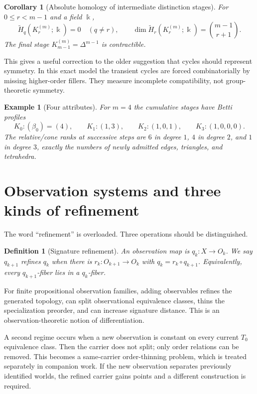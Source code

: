 \documentclass[11pt]{article}
\newtheorem{corollary}[theorem]{Corollary}
\newtheorem{definition}[theorem]{Definition}
\newtheorem{example}[theorem]{Example}
\begin{document}
\begin{corollary}[Absolute homology of intermediate distinction stages]
For $0\le r<m-1$ and a field $\Bbbk$,
\[
\widetilde H_q(K_r^{(m)};\Bbbk)=0\quad(q\neq r),
\qquad
\dim\widetilde H_r(K_r^{(m)};\Bbbk)=\binom{m-1}{r+1}.
\]
The final stage $K_{m-1}^{(m)}=\Delta^{m-1}$ is contractible.
\end{corollary}

This gives a useful correction to the older suggestion that cycles should represent symmetry.  In this exact model the transient cycles are forced combinatorially by missing higher-order fillers.  They measure incomplete compatibility, not group-theoretic symmetry.

\begin{example}[Four attributes]
For $m=4$ the cumulative stages have Betti profiles
\[
K_0:(\beta_0)=(4),\qquad
K_1:(1,3),\qquad
K_2:(1,0,1),\qquad
K_3:(1,0,0,0).
\]
The relative/cone ranks at successive steps are $6$ in degree $1$, $4$ in degree $2$, and $1$ in degree $3$, exactly the numbers of newly admitted edges, triangles, and tetrahedra.
\end{example}

\section{Observation systems and three kinds of refinement}

The word ``refinement'' is overloaded.  Three operations should be distinguished.

\begin{definition}[Signature refinement]
An observation map is $q_k:X\to O_k$.  We say $q_{k+1}$ refines $q_k$ when there is $r_k:O_{k+1}\to O_k$ with $q_k=r_k\circ q_{k+1}$.  Equivalently, every $q_{k+1}$-fiber lies in a $q_k$-fiber.
\end{definition}

For finite propositional observation families, adding observables refines the generated topology, can split observational equivalence classes, thins the specialization preorder, and can increase signature distance.  This is an observation-theoretic notion of differentiation.

A second regime occurs when a new observation is constant on every current $T_0$ equivalence class.  Then the carrier does not split; only order relations can be removed.  This becomes a same-carrier order-thinning problem, which is treated separately in companion work.  If the new observation separates previously identified worlds, the refined carrier gains points and a different construction is required.
\end{document}
